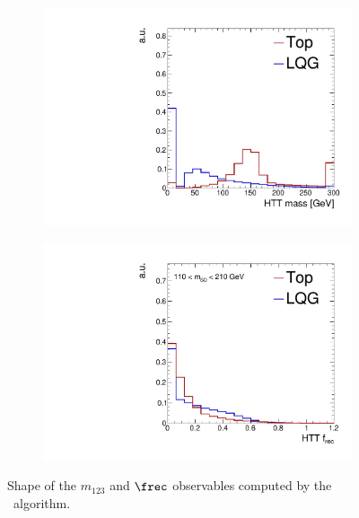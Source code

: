 \begin{figure}[]
    \begin{center}
        \begin{subfigure}[t]{0.35\textwidth}
            \includegraphics[width=\textwidth]{figures/toptagging/shapes/incl_fjHTTMass.pdf}
        \end{subfigure}
        \begin{subfigure}[t]{0.35\textwidth}
            \includegraphics[width=\textwidth]{figures/toptagging/shapes/mass_fjHTTFRec.pdf}
        \end{subfigure}
        \caption{Shape of the $m_{123}$ and $\frec$ observables computed by the \HTT~algorithm. }
        \label{fig:jets:htt}
    \end{center}
\end{figure}

